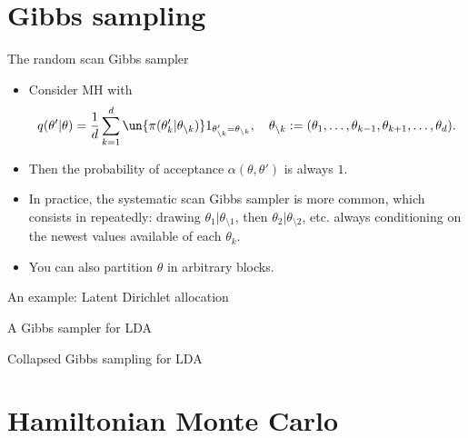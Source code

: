 \documentclass[10pt]{beamer}
\begin{document}
\section{Gibbs sampling}
\begin{frame}{The random scan Gibbs sampler}
\begin{itemize}
\item Consider MH with
$$
q(\theta'\vert\theta) = \frac1d \sum_{k=1}^d \un{\pi(\theta'_k\vert \theta_{\setminus k})} 1_{\theta'_{\setminus k} = \theta_{\setminus k}}, \quad \theta_{\setminus k}:= (\theta_1,\dots,\theta_{k-1},\theta_{k+1},\dots,\theta_d).
$$
\item Then the probability of acceptance $\alpha(\theta,\theta')$ is always $1$.
$$$$
\vfill
\item In practice, the systematic scan Gibbs sampler is more common, which consists in repeatedly: drawing $\theta_1\vert\theta_{\setminus 1}$, then $\theta_2\vert\theta_{\setminus 2}$, etc. always conditioning on the newest values available of each $\theta_k$.
\item You can also partition $\theta$ in arbitrary blocks.
\end{itemize}
\end{frame}

\begin{frame}{An example: Latent Dirichlet allocation}

\end{frame}

\begin{frame}{A Gibbs sampler for LDA}

\end{frame}

\begin{frame}{Collapsed Gibbs sampling for LDA}

\end{frame}

\section{Hamiltonian Monte Carlo}
\end{document}

